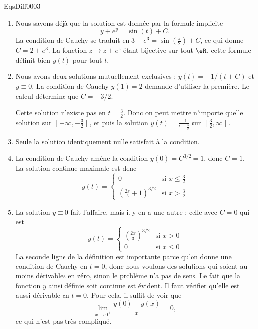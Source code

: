 \begin{corrige}{EqsDiff0003}
\begin{enumerate}
\item
Nous savons déjà que la solution est donnée par la formule implicite
\begin{equation}
	y+e^y=\sin(t)+C.
\end{equation}
La condition de Cauchy se traduit en $3+ e^{3}=\sin(\frac{ \pi }{ 2 })+C$, ce qui donne $C=2+ e^{3}$. La fonction $z\mapsto z+e^z$ étant bijective sur tout $\eR$, cette formule définit bien $y(t)$ pour tout $t$.

\item
Nous avons deux solutions mutuellement exclusives : $y(t)=-1/(t+C)$ et $y\equiv 0$. La condition de Cauchy $y(1)=2$ demande d'utiliser la première. Le calcul détermine que $C=-3/2$.

Cette solution n'existe pas en $t=\frac{ 3 }{ 2 }$. Donc on peut mettre n'importe quelle solution sur $\mathopen]-\infty,-\frac{ 3 }{ 2 }\mathclose[$, et puis la solution $y(t)=\frac{ -1 }{ t-\frac{ 3 }{ 2 } }$ sur $\mathopen]\frac{ 3 }{ 2 },\infty\mathclose[$.

\item
Seule la solution identiquement nulle satisfait à la condition.

\item
La condition de Cauchy amène la condition $y(0)=C^{3/2}=1$, donc $C=1$. La solution continue maximale est donc
\begin{equation}
	y(t)=\begin{cases}
	0	&	\text{si }x\leq\frac{ 3 }{ 2 }\\
	\left( \frac{ 2x }{ 3 }+1 \right)^{3/2}	&	 \text{si }x>\frac{ 3 }{ 2 }
\end{cases}
\end{equation}

\item
La solution $y\equiv 0$ fait l'affaire, mais il y en a une autre : celle avec $C=0$ qui est
\begin{equation}
	y(t)=\begin{cases}
	\left( \frac{ 2x }{ 3 } \right)^{3/2}	&	\text{si }x>0\\
	0	&	 \text{si }x\leq 0
\end{cases}
\end{equation}
La seconde ligne de la définition est importante parce qu'on donne une condition de Cauchy en $t=0$, donc nous voulons des solutions qui soient au moins dérivables en zéro, sinon le problème n'a pas de sens. Le fait que la fonction $y$ ainsi définie soit continue est évident. Il faut vérifier qu'elle est aussi dérivable en $t=0$. Pour cela, il suffit de voir que
\begin{equation}
	\lim_{x\to 0^+} \frac{ y(0)-y(x) }{ x }=0,
\end{equation}
ce qui n'est pas très compliqué.


\end{enumerate}
\end{corrige}
